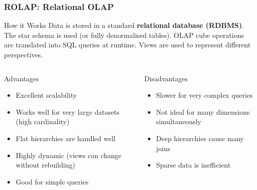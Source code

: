 \begin{frame}
  \frametitle{ROLAP: Relational OLAP}

  \begin{block}{How it Works}
    Data is stored in a standard \textbf{relational database (RDBMS)}.
    The star schema is used (or fully denormalised tables).
    OLAP cube operations are translated into SQL queries at runtime.
    Views are used to represent different perspectives.
  \end{block}

  \begin{columns}[T]
    \begin{block}{Advantages}
      \begin{itemize}
        \item Excellent scalability
        \item Works well for very large datasets (high cardinality)
        \item Flat hierarchies are handled well
        \item Highly dynamic (views can change without rebuilding)
        \item Good for simple queries
      \end{itemize}
    \end{block}

    \begin{alertblock}{Disadvantages}
      \begin{itemize}
        \item Slower for very complex queries
        \item Not ideal for many dimensions simultaneously
        \item Deep hierarchies cause many joins
        \item Sparse data is inefficient
      \end{itemize}
    \end{alertblock}
  \end{columns}
\end{frame}

